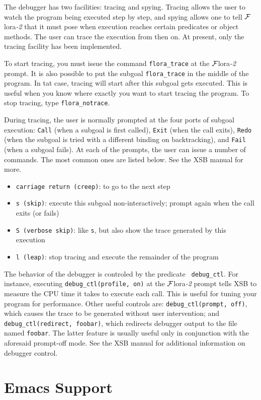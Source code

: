 \documentclass[11pt]{article}
\newcommand{\FLORA}{{\mbox{${\cal F}${\sc lora}\rm\emph{-2}}}\xspace}
\begin{document}
The debugger has two facilities: tracing and spying. Tracing allows the
user to watch the program being executed step by step, and spying allows
one to tell \FLORA that it must pose when execution reaches certain 
predicates or object methods. The user can trace the execution from then
on. At present, only the tracing facility has been implemented.

To start tracing, you must issue the command {\tt flora\_trace} at the
\FLORA prompt. It is also possible to put the subgoal {\tt flora\_trace} in
the middle of the program. In tat case, tracing will start after this
subgoal gets executed. This is useful when you know where exactly you want
to start tracing the program. To stop tracing, type {\tt flora\_notrace}.

During tracing, the user is normally prompted at the four ports of subgoal
execution: {\tt Call} (when a subgoal is first called), {\tt Exit} (when
the call exits), {\tt Redo} (when the subgoal is tried with a different
binding on backtracking), and {\tt Fail} (when a subgoal fails).
At each of the prompts, the user can issue a number of commands. The most
common ones are listed below. See the XSB manual for more.
\begin{itemize}
  \item {\tt carriage return (creep)}:  to go to the next step  
  \item {\tt s (skip)}: execute this subgoal non-interactively; prompt
    again when the call exits (or fails)
  \item {\tt S (verbose skip)}: like {\tt s}, but also show the trace
    generated by this execution
  \item {\tt l (leap)}: stop tracing and execute the remainder of the
    program
\end{itemize}
The behavior of the debugger is controled by the predicate {\tt
  debug\_ctl}. For instance, executing {\tt debug\_ctl(profile, on)} at the
\FLORA prompt tells XSB to measure the CPU time it takes to execute each
call. This is useful for tuning your program for performance. Other useful
controls are: {\tt debug\_ctl(prompt, off)}, which causes the trace to be
generated without user intervention; and {\tt debug\_ctl(redirect,
  foobar)}, which redirects debugger output to the file named {\tt foobar}.
The latter feature is usually useful only in conjunction with the
  aforesaid prompt-off mode. See the XSB manual for additional information
  on debugger control.


\section{Emacs Support}
\end{document}
